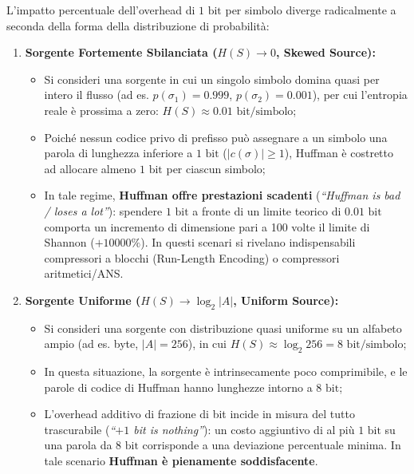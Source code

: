 L'impatto percentuale dell'overhead di $1\text{ bit}$ per simbolo diverge radicalmente a seconda della forma della distribuzione di probabilit\`a:

\begin{enumerate}
  \item \textbf{Sorgente Fortemente Sbilanciata ($H(S) \to 0$, Skewed Source):}
  \begin{itemize}
    \item Si consideri una sorgente in cui un singolo simbolo domina quasi per intero il flusso (ad es. $p(\sigma_1) = 0.999$, $p(\sigma_2) = 0.001$), per cui l'entropia reale \`e prossima a zero: $H(S) \approx 0.01\text{ bit/simbolo}$;
    \item Poich\'e nessun codice privo di prefisso pu\`o assegnare a un simbolo una parola di lunghezza inferiore a $1\text{ bit}$ ($\vert c(\sigma) \vert \ge 1$), Huffman \`e costretto ad allocare almeno $1\text{ bit}$ per ciascun simbolo;
    \item In tale regime, \textbf{Huffman offre prestazioni scadenti} (\textit{``Huffman is bad / loses a lot''}): spendere $1\text{ bit}$ a fronte di un limite teorico di $0.01\text{ bit}$ comporta un incremento di dimensione pari a 100 volte il limite di Shannon ($+10000\%$). In questi scenari si rivelano indispensabili compressori a blocchi (Run-Length Encoding) o compressori aritmetici/ANS.
  \end{itemize}

  \item \textbf{Sorgente Uniforme ($H(S) \to \log_2 \vert A \vert$, Uniform Source):}
  \begin{itemize}
    \item Si consideri una sorgente con distribuzione quasi uniforme su un alfabeto ampio (ad es. byte, $\vert A \vert = 256$), in cui $H(S) \approx \log_2 256 = 8\text{ bit/simbolo}$;
    \item In questa situazione, la sorgente \`e intrinsecamente poco comprimibile, e le parole di codice di Huffman hanno lunghezze intorno a $8\text{ bit}$;
    \item L'overhead additivo di frazione di bit incide in misura del tutto trascurabile (\textit{``$+1$ bit is nothing''}): un costo aggiuntivo di al pi\`u $1\text{ bit}$ su una parola da $8\text{ bit}$ corrisponde a una deviazione percentuale minima. In tale scenario \textbf{Huffman \`e pienamente soddisfacente}.
  \end{itemize}
\end{enumerate}

